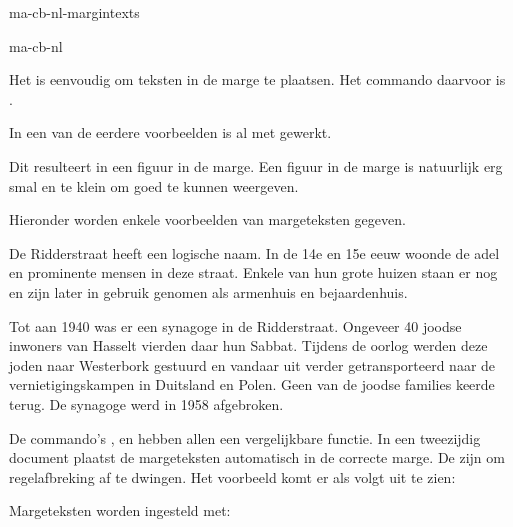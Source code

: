 \startonderdeel ma-cb-nl-margintexts

\produkt ma-cb-nl




Het is eenvoudig om teksten in de marge te plaatsen. Het
commando daarvoor is \type{\inmarge}.


In een van de eerdere voorbeelden is al met \type{\inmarge}
gewerkt.

\typebuffer[margefiguur]

Dit resulteert in een figuur in de \paginareferentie
[margefiguur]\haalbuffer[margefiguur]marge. Een
figuur in de marge is natuurlijk erg smal en te klein om
goed te kunnen weergeven.

Hieronder worden enkele voorbeelden van margeteksten
gegeven.

\startbuffer
De Ridderstraat  heeft een logische
naam. In de 14e en 15e eeuw woonde de adel en prominente
mensen in deze straat. Enkele van hun grote huizen staan er
nog en zijn later in gebruik genomen als armenhuis
 en bejaardenhuis.

Tot aan 1940 was er een synagoge
in de Ridderstraat. Ongeveer 40 joodse inwoners van Hasselt
vierden daar hun Sabbat. Tijdens de oorlog werden deze joden
naar Westerbork gestuurd en vandaar uit verder
getransporteerd naar de vernietigingskampen in Duitsland en
Polen. Geen van de joodse families keerde terug. De
synagoge werd in 1958 afgebroken.
\stopbuffer

\typebuffer

De commando's \type{\inmarge}, \type{\inlinker} en
\type{\inrechter} hebben allen een vergelijkbare functie. In
een tweezijdig document plaatst \type{\inmarge} de
margeteksten automatisch in de correcte marge. De \type{\\}
zijn om regelafbreking af te dwingen. Het voorbeeld komt er
als volgt uit te zien:

\haalbuffer

Margeteksten worden ingesteld met:

\starttypen
\stelinmargesin
\stoptypen

\stoponderdeel

